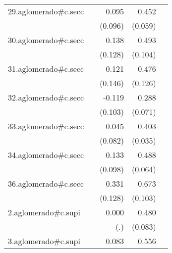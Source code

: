 {\begin{longtable}{l*{4}{D{.}{.}{-1}}}
\addlinespace
29.aglomerado#c.secc&                     &       0.095         &       0.452\sym{***}&                     \\
            &                     &     (0.096)         &     (0.059)         &                     \\
\addlinespace
30.aglomerado#c.secc&                     &       0.138         &       0.493\sym{***}&                     \\
            &                     &     (0.128)         &     (0.104)         &                     \\
\addlinespace
31.aglomerado#c.secc&                     &       0.121         &       0.476\sym{***}&                     \\
            &                     &     (0.146)         &     (0.126)         &                     \\
\addlinespace
32.aglomerado#c.secc&                     &      -0.119         &       0.288\sym{***}&                     \\
            &                     &     (0.103)         &     (0.071)         &                     \\
\addlinespace
33.aglomerado#c.secc&                     &       0.045         &       0.403\sym{***}&                     \\
            &                     &     (0.082)         &     (0.035)         &                     \\
\addlinespace
34.aglomerado#c.secc&                     &       0.133         &       0.488\sym{***}&                     \\
            &                     &     (0.098)         &     (0.064)         &                     \\
\addlinespace
36.aglomerado#c.secc&                     &       0.331\sym{**} &       0.673\sym{***}&                     \\
            &                     &     (0.128)         &     (0.103)         &                     \\
\addlinespace
2.aglomerado#c.supi&                     &       0.000         &       0.480\sym{***}&                     \\
            &                     &         (.)         &     (0.083)         &                     \\
\addlinespace
3.aglomerado#c.supi&                     &       0.083         &       0.556\sym{***}&                     \\

\end{longtable}}
